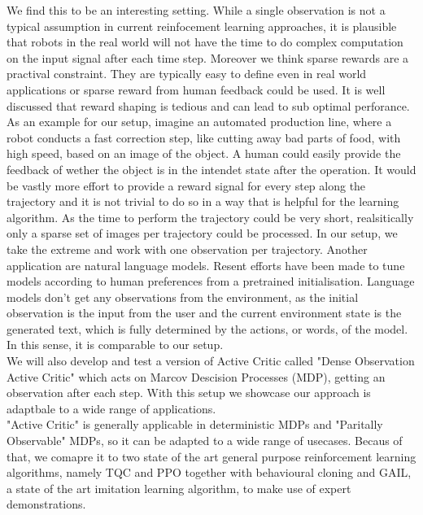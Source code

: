 We find this to be an interesting setting. While a single observation is not a typical assumption in current reinfocement learning approaches, it is plausible that robots in the real world 
will not have the time to do complex computation on the input signal after each time step. Moreover we think sparse rewards are a practival constraint. 
They are typically easy to define even in real world applications or sparse reward from human feedback could be used. It is well 
discussed that reward shaping is tedious and can lead to sub optimal perforance. As an example for our setup, imagine an automated production line, where a robot conducts a 
fast correction step, like cutting away bad parts of food, with high speed, based on an image of the object. A human could easily provide the feedback of wether 
the object is in the intendet state after the operation. It would be vastly more effort to provide a reward signal for every step along the trajectory and it is 
not trivial to do so in a way that is helpful for the learning algorithm. As the time to perform the trajectory could be very short, realsitically only a sparse set of images per trajectory could be 
processed. In our setup, we take the extreme and work with one observation per trajectory. Another application are natural language models. Resent efforts have been made to tune 
models according to human preferences from a pretrained initialisation. Language models don't get any observations from the environment, as the initial 
observation is the input from the user and the current environment state is the generated text, which is fully determined by the actions, or words, of the model. 
In this sense, it is comparable to our setup.\\

We will also develop and test a version of Active Critic called "Dense Observation Active Critic" which acts on Marcov Descision Processes (MDP), getting an observation after each step. With this setup we 
showcase our approach is adaptbale to a wide range of applications.\\

"Active Critic" is generally applicable in deterministic MDPs and "Paritally Observable" MDPs, 
so it can be adapted to a wide range of usecases. 
Becaus of that, we comapre it to two state of the art general purpose reinforcement learning algorithms, namely TQC and PPO together with behavioural cloning and GAIL, a state of the art 
imitation learning algorithm, to make use of expert demonstrations.

